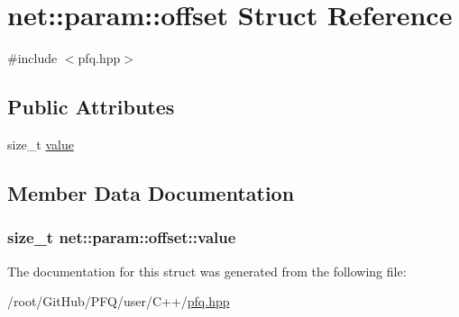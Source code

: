 \hypertarget{structnet_1_1param_1_1offset}{\section{net\-:\-:param\-:\-:offset Struct Reference}
\label{structnet_1_1param_1_1offset}
}


{\ttfamily \#include $<$pfq.\-hpp$>$}

\subsection*{Public Attributes}
\begin{DoxyCompactItemize}
\item 
size\-\_\-t \hyperlink{structnet_1_1param_1_1offset_ae2ed6199b781efd137a3485b2d581290}{value}
\end{DoxyCompactItemize}


\subsection{Member Data Documentation}
\hypertarget{structnet_1_1param_1_1offset_ae2ed6199b781efd137a3485b2d581290}{
\subsubsection[{value}]{\setlength{\rightskip}{0pt plus 5cm}size\-\_\-t net\-::param\-::offset\-::value}}\label{structnet_1_1param_1_1offset_ae2ed6199b781efd137a3485b2d581290}


The documentation for this struct was generated from the following file\-:\begin{DoxyCompactItemize}
\item 
/root/\-Git\-Hub/\-P\-F\-Q/user/\-C++/\hyperlink{pfq_8hpp}{pfq.\-hpp}\end{DoxyCompactItemize}
